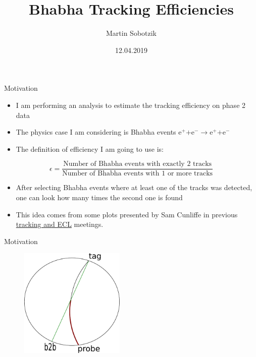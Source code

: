 \documentclass[10pt]{beamer}
\title{Bhabha Tracking Efficiencies}
\date{12.04.2019}
\author{Martin Sobotzik}
\institute{Johannes Gutenberg Universit\"at Mainz}
\begin{document}
\maketitle
{%



\begin{frame}{Motivation}

\begin{itemize}	
	\item I am performing an analysis to estimate the tracking efficiency on phase 2 data
	\item The physics case I am considering is Bhabha events $\textrm{e}^+ \textrm{+e}^- \rightarrow \textrm{e}^+ \textrm{+e}^- $ 
	\item The definition of efficiency I am going to use is:

\end{itemize}
	\begin{equation*}
		\epsilon = \frac{\textrm{Number of Bhabha events with exactly 2 tracks}}{\textrm{Number of Bhabha events with 1 or more tracks}}
	\end{equation*}
	
	\begin{itemize}
		\item After selecting Bhabha events where at least one of the tracks was detected, one can look how many times the second one is found
		\item  This idea comes from some plots presented by Sam Cunliffe in previous  \href{https://confluence.desy.de/display/BI/ECL+Meetings?preview=/84320165/109161400/SCunliffe181123-ECL.pdf}{tracking and ECL} meetings.
	\end{itemize}





\end{frame}
	
	
	\begin{frame}{Motivation}
		\begin{figure}
			\includegraphics[width=5cm]{Plots/b2b}
		\end{figure}
	\end{frame}
	
}
\end{document}
